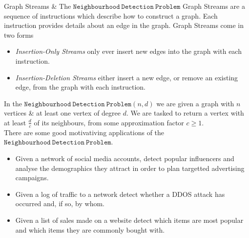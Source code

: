 \documentclass[ %
                    author={Dominic Hutchinson},
                supervisor={Dr. Christian Konrad},
                    degree={MEng Maths  and Computer Science},
                     title={Implementing and Evaluating Space Efficient Algorithms for Detecting Large Neighbourhoods in Graph Streams},
                  subtitle={},
                      type={Research},
                      year={2020} ]{poster}
\begin{document}

\begin{frame}{} 

\vfill

\begin{columns}[t]
  \begin{column}{0.900\linewidth}
  \begin{block}{\Large Graph Streams \& The $\mathtt{Neighbourhood\ Detection\ Problem}$}
 	\noindent
	Graph Streams are a sequence of instructions which describe how to construct a graph. Each instruction provides details about an edge in the graph. Graph Streams come in two forms
	\begin{itemize}
		\item \textit{Insertion-Only Streams} only ever insert new edges into the graph with each instruction.
		\item \textit{Insertion-Deletion Streams} either insert a new edge, or remove an existing edge, from the graph with each instruction.
	\end{itemize}
	In the $\mathtt{Neighbourhood\ Detection\ Problem}(n,d)$ we are given a graph with $n$ vertices \& at least one vertex of degree $d$. We are tasked to return a vertex with at least $\frac{d}c$ of its neighbours, from some approximation factor $c\geq1$.\\
	\noindent
	There are some good motivativing applications of the $\mathtt{Neighbourhood\ Detection\ Problem}$.
	\begin{itemize}
		\item Given a network of social media accounts, detect popular influencers and analyse the demographics they attract in order to plan targetted advertising campaigns.
		\item Given a log of traffic to a network detect whether a DDOS attack has occurred and, if so, by whom.
		\item Given a list of sales made on a website detect which items are most popular and which items they are commonly bought with.
	\end{itemize}
  \end{block}
  \end{column}
\end{columns}

\vfill

\begin{columns}[t]


\end{columns}
\end{frame}
\end{document}
